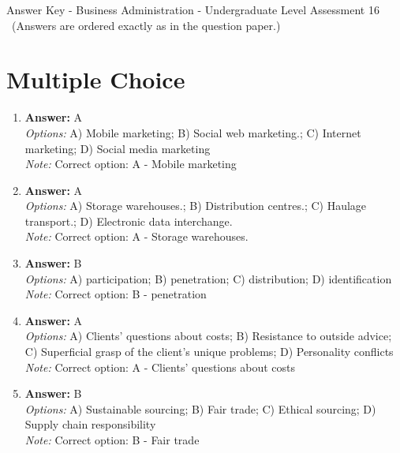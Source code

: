 \documentclass[12pt]{article}
\begin{document}
\begin{center}
Answer Key - Business Administration - Undergraduate Level Assessment 16 \
\small (Answers are ordered exactly as in the question paper.)
\end{center}

\section*{Multiple Choice}
\begin{enumerate}[label=\arabic*.]
\item \textbf{Answer:} A
\\ \textit{Options:} A) Mobile marketing; B) Social web marketing.; C) Internet marketing; D) Social media marketing
\\ \textit{Note:} Correct option: A - Mobile marketing
\item \textbf{Answer:} A
\\ \textit{Options:} A) Storage warehouses.; B) Distribution centres.; C) Haulage transport.; D) Electronic data interchange.
\\ \textit{Note:} Correct option: A - Storage warehouses.
\item \textbf{Answer:} B
\\ \textit{Options:} A) participation; B) penetration; C) distribution; D) identification
\\ \textit{Note:} Correct option: B - penetration
\item \textbf{Answer:} A
\\ \textit{Options:} A) Clients' questions about costs; B) Resistance to outside advice; C) Superficial grasp of the client's unique problems; D) Personality conflicts
\\ \textit{Note:} Correct option: A - Clients' questions about costs
\item \textbf{Answer:} B
\\ \textit{Options:} A) Sustainable sourcing; B) Fair trade; C) Ethical sourcing; D) Supply chain responsibility
\\ \textit{Note:} Correct option: B - Fair trade
\end{enumerate}
\end{document}
